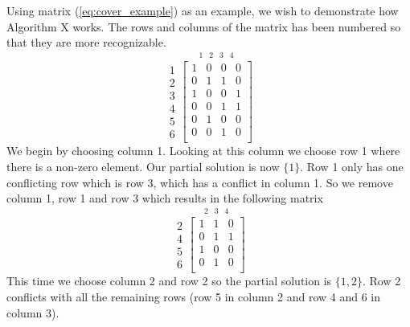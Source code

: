 Using matrix (\ref{eq:cover_example}) as an example, we wish to demonstrate how Algorithm X works.
The rows and columns of the matrix has been numbered so that they are more recognizable.
\begin{equation}
	\label{eq:ces1}
	\begin{array}{r} 1\\ 2\\ 3\\ 4\\ 5\\ 6 \end{array}
	\stackrel{
		\begin{array}{cccc} 1 & 2 & 3 & 4 \end{array}
	}{
		\begin{bmatrix}
			1 & 0 & 0 & 0 \\
			0 & 1 & 1 & 0 \\
			1 & 0 & 0 & 1 \\
			0 & 0 & 1 & 1 \\
			0 & 1 & 0 & 0 \\
			0 & 0 & 1 & 0 \\
		\end{bmatrix}
	}
\end{equation}
We begin by choosing column 1.
Looking at this column we choose row 1 where there is a non-zero element.
Our partial solution is now $\{ 1 \}$.
Row 1 only has one conflicting row which is row 3, which has a conflict in column 1.
So we remove column 1, row 1 and row 3 which results in the following matrix
\begin{equation}
	\label{eq:ces2}
	\begin{array}{r} 2\\ 4\\ 5\\ 6 \end{array}
	\stackrel{
		\begin{array}{ccc} 2 & 3 & 4 \end{array}
	}{
		\begin{bmatrix}
			1 & 1 & 0 \\
			0 & 1 & 1 \\
			1 & 0 & 0 \\
			0 & 1 & 0 \\
		\end{bmatrix}
	}
\end{equation}
This time we choose column 2 and row 2 so the partial solution is $\{ 1, 2 \}$.
Row 2 conflicts with all the remaining rows (row 5 in column 2 and row 4 and 6 in column 3).
